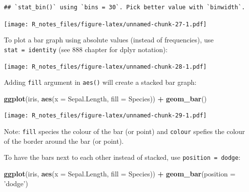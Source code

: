 \documentclass[]{book}
\newenvironment{Shaded}{\begin{snugshade}}{\end{snugshade}}
\newcommand{\KeywordTok}[1]{\textcolor[rgb]{0.13,0.29,0.53}{\textbf{#1}}}
\newcommand{\DataTypeTok}[1]{\textcolor[rgb]{0.13,0.29,0.53}{#1}}
\newcommand{\StringTok}[1]{\textcolor[rgb]{0.31,0.60,0.02}{#1}}
\newcommand{\OperatorTok}[1]{\textcolor[rgb]{0.81,0.36,0.00}{\textbf{#1}}}
\newcommand{\NormalTok}[1]{#1}
\begin{document}
\begin{verbatim}
## `stat_bin()` using `bins = 30`. Pick better value with `binwidth`.
\end{verbatim}

\texttt{[image: R\_notes\_files/figure-latex/unnamed-chunk-27-1.pdf]}

To plot a bar graph using absolute values (instead of frequencies), use
\texttt{stat\ =\ \textquotesingle{}identity\textquotesingle{}} (see 888
chapter for dplyr notation):

\begin{Shaded}
\end{Shaded}

\texttt{[image: R\_notes\_files/figure-latex/unnamed-chunk-28-1.pdf]}

Adding \texttt{fill} argument in \texttt{aes()} will create a stacked
bar graph:

\begin{Shaded}
\begin{Highlighting}[]
\KeywordTok{ggplot}\NormalTok{(iris, }\KeywordTok{aes}\NormalTok{(}\DataTypeTok{x =}\NormalTok{ Sepal.Length, }\DataTypeTok{fill =}\NormalTok{ Species)) }\OperatorTok{+}\StringTok{ }
\StringTok{  }\KeywordTok{geom_bar}\NormalTok{()}
\end{Highlighting}
\end{Shaded}

\texttt{[image: R\_notes\_files/figure-latex/unnamed-chunk-29-1.pdf]}

Note: \texttt{fill} species the colour of the bar (or point) and
\texttt{colour} spefies the colour of the border around the bar (or
point).

To have the bars next to each other instead of stacked, use
\texttt{position\ =\ \textquotesingle{}dodge\textquotesingle{}}:

\begin{Shaded}
\begin{Highlighting}[]
\KeywordTok{ggplot}\NormalTok{(iris, }\KeywordTok{aes}\NormalTok{(}\DataTypeTok{x =}\NormalTok{ Sepal.Length, }\DataTypeTok{fill =}\NormalTok{ Species)) }\OperatorTok{+}\StringTok{ }
\StringTok{  }\KeywordTok{geom_bar}\NormalTok{(}\DataTypeTok{position =} \StringTok{'dodge'}\NormalTok{)}
\end{Highlighting}
\end{Shaded}
\end{document}
